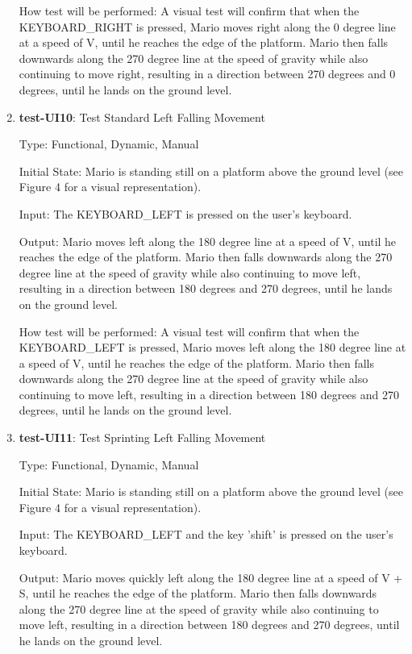 \documentclass[12pt, titlepage]{article}
\begin{document}
\begin{enumerate}
How test will be performed: A visual test will confirm that when the KEYBOARD\_RIGHT is pressed, Mario moves right along the 0 degree line at a speed of V, until he reaches the edge of the platform. Mario then falls downwards along the 270 degree line at the speed of gravity while also continuing to move right, resulting in a direction between 270 degrees and 0 degrees, until he lands on the ground level.

\item{\textbf{test-UI10}: Test Standard Left Falling Movement\\}

Type: Functional, Dynamic, Manual
					
Initial State: Mario is standing still on a platform above the ground level (see Figure 4 for a visual representation).
					
Input: The KEYBOARD\_LEFT is pressed on the user's keyboard.
					
Output: Mario moves left along the 180 degree line at a speed of V, until he reaches the edge of the platform. Mario then falls downwards along the 270 degree line at the speed of gravity while also continuing to move left, resulting in a direction between 180 degrees and 270 degrees, until he lands on the ground level.
					
How test will be performed: A visual test will confirm that when the KEYBOARD\_LEFT is pressed, Mario moves left along the 180 degree line at a speed of V, until he reaches the edge of the platform. Mario then falls downwards along the 270 degree line at the speed of gravity while also continuing to move left, resulting in a direction between 180 degrees and 270 degrees, until he lands on the ground level.

\item{\textbf{test-UI11}: Test Sprinting Left Falling Movement\\}

Type: Functional, Dynamic, Manual
					
Initial State: Mario is standing still on a platform above the ground level (see Figure 4 for a visual representation).
					
Input: The KEYBOARD\_LEFT and the key 'shift' is pressed on the user's keyboard.
					
Output: Mario moves quickly left along the 180 degree line at a speed of V + S, until he reaches the edge of the platform. Mario then falls downwards along the 270 degree line at the speed of gravity while also continuing to move left, resulting in a direction between 180 degrees and 270 degrees, until he lands on the ground level.
					

\end{enumerate}
\end{document}
